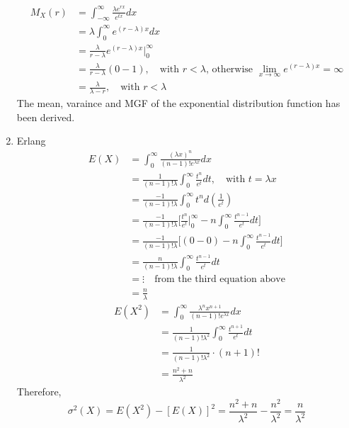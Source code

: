 \documentclass[UTF8]{article}
\begin{document}
\begin{enumerate}
        \begin{equation*}
          \begin{split}
             M_X(r) & =\int_{-\infty}^{\infty}\frac{\lambda e^{rx}}{e^{tx}}dx \\
               & =\lambda\int_{0}^{\infty}e^{(r-\lambda)x}dx\\
               & =\frac{\lambda}{r-\lambda}e^{(r-\lambda)x}\big|^\infty_0\\
               &=\frac{\lambda}{r-\lambda}(0-1),\quad\text{with $r<\lambda$, otherwise $\lim_{x\rightarrow\infty}e^{(r-\lambda)x}=\infty$}\\
               &=\frac{\lambda}{\lambda-r},\quad\text{with $r<\lambda$}
          \end{split}
        \end{equation*}
        The mean, varaince and MGF of the exponential distribution function has been derived.
        \item Erlang
            \begin{equation*}
                \begin{split}
                    E(X) &=\int_{0}^\infty\frac{(\lambda x)^{n}}{(n-1)!e^{\lambda x}}dx\\
                    &=\frac{1}{(n-1)!\lambda}\int_0^\infty\frac{t^n}{e^t}dt,\quad\text{with $t=\lambda x$}\\
                    &=\frac{-1}{(n-1)!\lambda}\int_0^\infty t^nd(\frac{1}{e^t})\\
                    &=\frac{-1}{(n-1)!\lambda}\bigg[\frac{t^n}{e^t}\bigg|^\infty_0-n\int^\infty_0\frac{t^{n-1}}{e^t}dt\bigg]\\
                    &=\frac{-1}{(n-1)!\lambda}\bigg[(0-0)-n\int^\infty_0\frac{t^{n-1}}{e^t}dt\bigg]\\
                    &=\frac{n}{(n-1)!\lambda}\int^\infty_0\frac{t^{n-1}}{e^t}dt\\
                    &=\vdots\quad\text{from the third equation above}\\
                    &=\frac{n}{\lambda}
                \end{split}
            \end{equation*}
            \begin{equation*}
                \begin{split}
                    E(X^2) &= \int^\infty_{0}\frac{\lambda^nx^{n+1}}{(n-1)!e^{\lambda x}}dx\\
                    &= \frac{1}{(n-1)!\lambda^2}\int_0^\infty\frac{t^{n+1}}{e^t}dt\\
                    &= \frac{1}{(n-1)!\lambda^2}\cdot(n+1)!\\
                    &= \frac{n^2+n}{\lambda^2}
                \end{split}
            \end{equation*}
            Therefore, 
            \begin{equation*}
                \sigma^2(X)=E(X^2)-[E(X)]^2=\frac{n^2+n}{\lambda^2}-\frac{n^2}{\lambda^2}=\frac{n}{\lambda^2}
            \end{equation*}


\end{enumerate}
\end{document}
